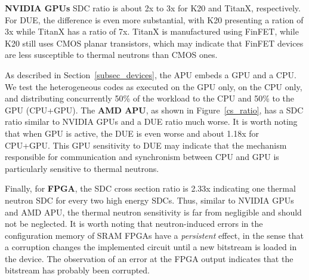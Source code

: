 \textbf{NVIDIA GPUs} SDC ratio is about 2x to 3x for K20 and TitanX, respectively. For DUE, the difference is even more substantial,  with K20 presenting a ration of 3x while TitanX has a ratio of 7x. TitanX is manufactured using FinFET, while K20 still uses CMOS planar transistors, which may indicate that FinFET devices are less susceptible to thermal neutrons than CMOS ones.

As described in Section~\ref{subsec_devices}, the APU embeds a GPU and a CPU. We test the heterogeneous codes as executed on the GPU only, on the CPU only, and distributing concurrently 50\% of the workload to the CPU and 50\% to the GPU (CPU+GPU). The \textbf{AMD APU}, as shown in Figure~\ref{cs_ratio}, has a SDC ratio similar to NVIDIA GPUs and a DUE ratio much worse. It is worth noting that when GPU is active, the DUE is even worse and about 1.18x for CPU+GPU. This GPU sensitivity to DUE may indicate that the mechanism responsible for communication and synchronism between CPU and GPU is particularly sensitive to thermal neutrons.

Finally, for \textbf{FPGA}, the SDC cross section ratio is 2.33x indicating one thermal neutron SDC for every two high energy SDCs. Thus, similar to NVIDIA GPUs and AMD APU, the thermal neutron sensitivity is far from negligible and should not be neglected.
It is worth noting that neutron-induced errors in the configuration memory of SRAM FPGAs have a \textit{persistent} effect, in the sense that a corruption changes the implemented circuit until a new bitstream is loaded in the device. The observation of an error at the FPGA output indicates that the bitstream has probably been corrupted. 


